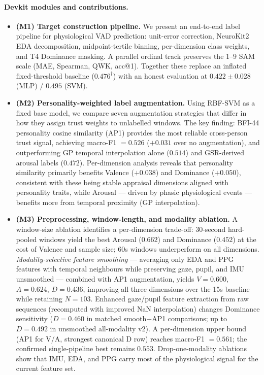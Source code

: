 \documentclass[sigconf,nonacm]{acmart}
\begin{document}
\paragraph{Devkit modules and contributions.}
\begin{itemize}[leftmargin=1.2em,topsep=2pt,itemsep=1pt]

  \item \textbf{(M1) Target construction pipeline.}
    We present an end-to-end label pipeline for physiological VAD prediction:
    unit-error correction, NeuroKit2 EDA decomposition, midpoint-tertile
    binning, per-dimension class weights, and T4 Dominance masking.
    A parallel ordinal track preserves the 1--9 SAM scale (MAE, Spearman,
    QWK, acc@1).
    Together these replace an inflated fixed-threshold baseline
    ($0.476^\dagger$) with an honest evaluation at $0.422 \pm 0.028$
    (MLP) / $0.495$ (SVM).

  \item \textbf{(M2) Personality-weighted label augmentation.}
    Using RBF-SVM as a fixed base model, we compare seven augmentation
    strategies that differ in how they assign trust weights to unlabelled
    windows.
    The key finding: BFI-44 personality cosine similarity (AP1) provides
    the most reliable cross-person trust signal, achieving macro-F1 $= 0.526$
    ($+0.031$ over no augmentation), and outperforming GP temporal
    interpolation alone ($0.514$) and GSR-derived arousal labels ($0.472$).
    Per-dimension analysis reveals that personality similarity primarily
    benefits Valence ($+0.038$) and Dominance ($+0.050$), consistent with
    these being stable appraisal dimensions aligned with personality traits,
    while Arousal --- driven by phasic physiological events --- benefits more
    from temporal proximity (GP interpolation).

  \item \textbf{(M3) Preprocessing, window-length, and modality ablation.}
    A window-size ablation identifies a per-dimension trade-off:
    30-second hard-pooled windows yield the best Arousal ($0.662$) and
    Dominance ($0.452$) at the cost of Valence and sample size;
    60s windows underperform on all dimensions.
    \emph{Modality-selective feature smoothing} --- averaging only EDA and
    PPG features with temporal neighbours while preserving gaze, pupil, and
    IMU unsmoothed --- combined with AP1 augmentation, yields
    $V{=}0.600$, $A{=}0.624$, $D{=}0.436$, improving all
    three dimensions over the 15s baseline while retaining $N{=}103$.
    Enhanced gaze/pupil feature extraction from raw sequences (recomputed
    with improved NaN interpolation) changes Dominance sensitivity
    ($D{=}0.460$ in matched smooth+AP1 comparisons; up to $D{=}0.492$ in
    unsmoothed all-modality v2).
    A per-dimension upper bound (AP1 for V/A, strongest canonical D row)
    reaches macro-F1 $= 0.561$; the confirmed single-pipeline best remains
    $0.553$.
    Drop-one-modality ablations show that IMU, EDA, and PPG carry most of
    the physiological signal for the current feature set.


\end{itemize}
\end{document}
